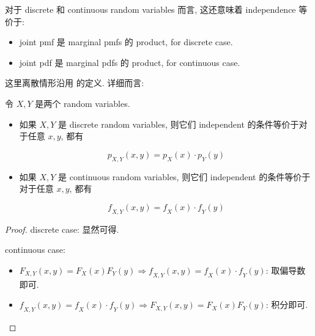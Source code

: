 对于 discrete 和 continuous random variables 而言, 这还意味着 independence 等价于:

\begin{itemize}
\item
  joint pmf 是 marginal pmfs 的 product, for discrete case.
\item
  joint pdf 是 marginal pdfs 的 product, for continuous case.
\end{itemize}

这里离散情形沿用  的定义. 详细而言:

\begin{theorem}{}

令 \(\mathit{X},\mathit{Y}\) 是两个 random variables.

\begin{itemize}
\item
  如果 \(\mathit{X},\mathit{Y}\) 是 discrete random variables, 则它们 independent 的条件等价于对于任意 \(\mathit{x},\mathit{y}\), 都有

  \[\mathit{p}_{\mathit{X},\mathit{Y}}(\mathit{x},\mathit{y}) = \mathit{p}_{\mathit{X}}(\mathit{x}) \cdot \mathit{p}_{\mathit{Y}}(\mathit{y})\]
\item
  如果 \(\mathit{X},\mathit{Y}\) 是 continuous random variables, 则它们 independent 的条件等价于对于任意 \(\mathit{x},\mathit{y}\), 都有

  \[\mathit{f}_{\mathit{X},\mathit{Y}}(\mathit{x},\mathit{y}) = \mathit{f}_{\mathit{X}}(\mathit{x}) \cdot \mathit{f}_{\mathit{Y}}(\mathit{y})\]
\end{itemize}

\end{theorem}

\begin{proof}

discrete case: 显然可得.

continuous case:

\begin{itemize}
\item
  \(\mathit{F}_{\mathit{X},\mathit{Y}}(\mathit{x},\mathit{y}) = \mathit{F}_{\mathit{X}}(\mathit{x})\mathit{F}_{\mathit{Y}}(\mathit{y})\Longrightarrow\mathit{f}_{\mathit{X},\mathit{Y}}(\mathit{x},\mathit{y}) = \mathit{f}_{\mathit{X}}(\mathit{x}) \cdot \mathit{f}_{\mathit{Y}}(\mathit{y})\): 取偏导数即可.
\item
  \(\mathit{f}_{\mathit{X},\mathit{Y}}(\mathit{x},\mathit{y}) = \mathit{f}_{\mathit{X}}(\mathit{x}) \cdot \mathit{f}_{\mathit{Y}}(\mathit{y})\Longrightarrow\mathit{F}_{\mathit{X},\mathit{Y}}(\mathit{x},\mathit{y}) = \mathit{F}_{\mathit{X}}(\mathit{x})\mathit{F}_{\mathit{Y}}(\mathit{y})\): 积分即可.
\end{itemize}

\end{proof}

